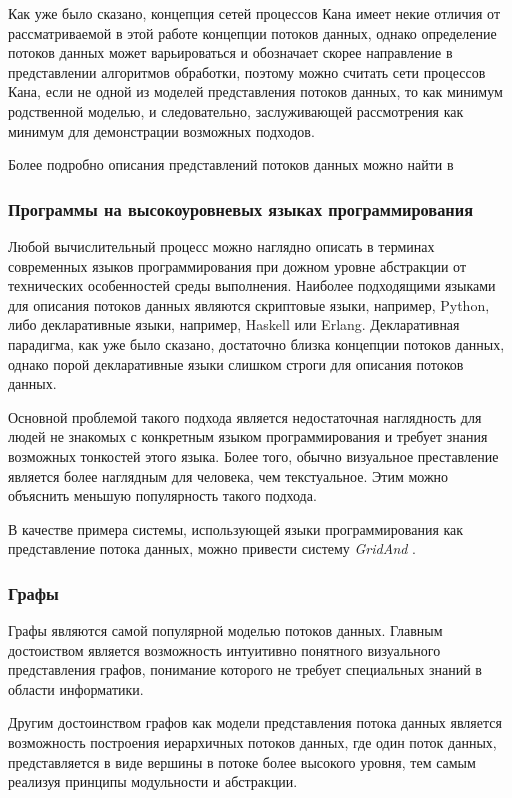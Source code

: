 \documentclass[10pt,a4paper]{article}
\begin{document}
Как уже было сказано, концепция сетей процессов Кана имеет некие отличия от рассматриваемой в этой работе концепции потоков данных,
однако определение потоков данных может варьироваться и обозначает скорее направление в представлении алгоритмов обработки,
поэтому можно считать сети процессов Кана, если не одной из моделей представления потоков данных, то как минимум родственной моделью,
и следовательно, заслуживающей рассмотрения как минимум для демонстрации возможных подходов.

Более подробно описания представлений потоков данных можно найти в \cite{sci-wf-systems}

\subsubsection{Программы на высокоуровневых языках программирования}
Любой вычислительный процесс можно наглядно описать в терминах современных языков программирования при дожном уровне абстракции от технических особенностей среды выполнения.
Наиболее подходящими языками для описания потоков данных являются скриптовые языки, например, Python, либо декларативные языки, например, Haskell или Erlang.
Декларативная парадигма, как уже было сказано, достаточно близка концепции потоков данных, однако порой декларативные языки слишком строги для описания потоков данных.

Основной проблемой такого подхода является недостаточная наглядность для людей не знакомых с конкретным языком программирования и требует знания возможных тонкостей этого языка.
Более того, обычно визуальное преставление является более наглядным для человека, чем текстуальное. Этим можно объяснить меньшую популярность такого подхода.

В качестве примера системы, использующей языки программирования как представление потока данных, можно привести систему \textit{GridAnd} \cite{grid-ant}.

\subsubsection{Графы}
Графы являются самой популярной моделью потоков данных.
Главным достоиством является возможность интуитивно понятного визуального представления графов, понимание которого не требует специальных знаний в области информатики.

Другим достоинством графов как модели представления потока данных является возможность построения иерархичных потоков данных, где один поток данных,
представляется в виде вершины в потоке более высокого уровня, тем самым реализуя принципы модульности и абстракции.
\end{document}
